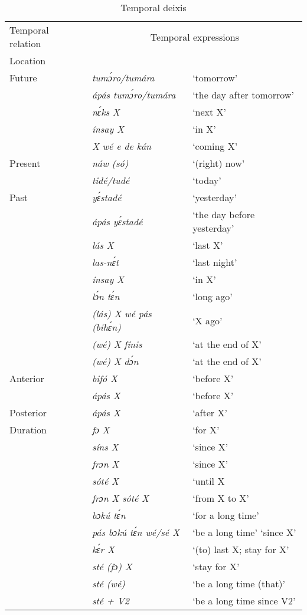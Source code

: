 \begin{table}
\caption{Temporal deixis}
\label{tab:key:8.6}

\begin{tabularx}{\textwidth}{lXX}
\lsptoprule

Temporal relation & \multicolumn{2}{c}{Temporal expressions}\\
Location &  & \\
\midrule 
  Future & \itshape tumɔ́ro/tumára & ‘tomorrow’\\
& \itshape ápás tumɔ́ro/tumára & ‘the day after tomorrow’\\
& \itshape nɛ́ks X & ‘next X’\\
& \itshape ínsay X & ‘in X’\\
& \itshape X wé e de kán & ‘coming X’\\

\tablevspace
Present & \itshape náw (só) & ‘(right) now’\\
& \itshape tidé/tudé & ‘today’\\

\tablevspace
Past & \itshape yɛ́stadé & ‘yesterday’\\
& \itshape ápás yɛ́stadé & ‘the day before yesterday’\\
& \itshape lás X & ‘last X’\\
& \itshape las-nɛ́t & ‘last night’\\
& \itshape ínsay X & ‘in X’\\
& \itshape lɔ́n tɛ́n & ‘long ago’\\
& \itshape (lás) X wé pás (bihɛ́n) & ‘X ago’\\
& \itshape (wé) X fínis & ‘at the end of X’\\
& \itshape (wé) X dɔ́n & ‘at the end of X’\\

\tablevspace
Anterior & \itshape bifó X & ‘before X’\\
& \itshape ápás X & ‘before X’\\

\tablevspace
Posterior & \itshape ápás X & ‘after X’\\

\tablevspace
Duration & \itshape fɔ X & ‘for X’\\
& \itshape síns X & ‘since X’\\
& \itshape frɔn X & ‘since X’\\
& \itshape sóté X & ‘until X\\
& \itshape frɔn X sóté X & ‘from X to X’\\
& \itshape bɔkú tɛ́n & ‘for a long time’\\
& \itshape pás bɔkú tɛ́n wé/sé X & ‘be a long time’ ‘since X’\\
& \itshape kɛ́r X & ‘(to) last X; stay for X’\\
& \itshape sté (fɔ) X & ‘stay for X’\\
& \itshape sté (wé) & ‘be a long time (that)’\\
& \itshape sté + V2 & ‘be a long time since V2’\\


\end{tabularx}
\end{table}
